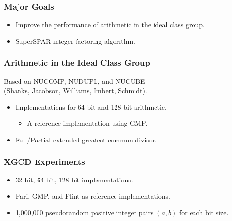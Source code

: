 \documentclass{beamer}
\begin{document}
\begin{frame}
\frametitle{Major Goals}
\begin{itemize}
\item Improve the performance of arithmetic in the ideal class group.
\item SuperSPAR integer factoring algorithm.
\end{itemize}
\end{frame}

  
\begin{frame}
\frametitle{Arithmetic in the Ideal Class Group}
Based on NUCOMP, NUDUPL, and NUCUBE \\(Shanks, Jacobson, Williams, Imbert, Schmidt).

\begin{itemize}
\item Implementations for 64-bit and 128-bit arithmetic.
	\begin{itemize}
	\item A reference implementation using GMP.
	\end{itemize}
\item Full/Partial extended greatest common divisor.
\end{itemize}

\end{frame}


\begin{frame}
\frametitle{XGCD Experiments}
\begin{itemize}
\item 32-bit, 64-bit, 128-bit implementations.
\item Pari, GMP, and Flint as reference implementations.
\item 1,000,000 pseudorandom positive integer pairs $(a,b)$ for each bit size.
\end{itemize}
\end{frame}
\end{document}
